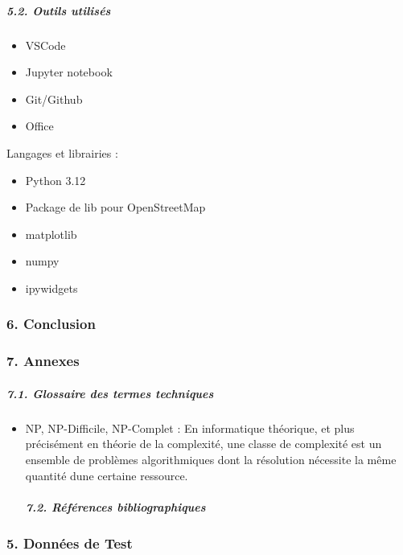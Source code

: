\subparagraph{5.2. Outils utilisés}\label{52-outils-utilisuxe9s}

\begin{itemize}
\tightlist
\item
  VSCode
\item
  Jupyter notebook
\item
  Git/Github
\item
  Office
\end{itemize}

Langages et librairies :

\begin{itemize}
\tightlist
\item
  Python 3.12
\item
  Package de lib pour OpenStreetMap
\item
  matplotlib
\item
  numpy
\item
  ipywidgets
\end{itemize}

\protect{}\label{0dc81c2e}
\subsubsection{6. Conclusion}\label{6-conclusion}

\protect{}\label{f2e9cf69}
\subsubsection{7. Annexes}\label{7-annexes}

\subparagraph{7.1. Glossaire des termes
techniques}\label{71-glossaire-des-termes-techniques}

\begin{itemize}
\item
  NP, NP-Difficile, NP-Complet : En informatique théorique, et plus
  précisément en théorie de la complexité, une classe de complexité est
  un ensemble de problèmes algorithmiques dont la résolution nécessite
  la même quantité d\textquotesingle une certaine ressource.

  \subparagraph{7.2. Références
  bibliographiques}\label{72-ruxe9fuxe9rences-bibliographiques}
\end{itemize}

\protect{}\label{7047559e}
\subsubsection{5. Données de Test}\label{5-donnuxe9es-de-test}

